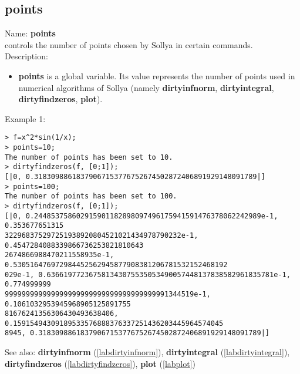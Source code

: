 \subsection{points}
\label{labpoints}
\noindent Name: \textbf{points}\\
controls the number of points chosen by Sollya in certain commands.\\

\noindent Description: \begin{itemize}

\item \textbf{points} is a global variable. Its value represents the number of points
   used in numerical algorithms of Sollya (namely \textbf{dirtyinfnorm},
   \textbf{dirtyintegral}, \textbf{dirtyfindzeros}, \textbf{plot}).
\end{itemize}
\noindent Example 1: 
\begin{center}\begin{minipage}{15cm}\begin{Verbatim}[frame=single]
> f=x^2*sin(1/x);
> points=10;
The number of points has been set to 10.
> dirtyfindzeros(f, [0;1]);
[|0, 0.31830988618379067153776752674502872406891929148091789|]
> points=100;
The number of points has been set to 100.
> dirtyfindzeros(f, [0;1]);
[|0, 0.244853758602915901182898097496175941591476378062242989e-1, 0.353677651315
322968375297251938920804521021434978790232e-1, 0.4547284088339866736253821810643
2674866988470211558935e-1, 0.530516476972984452562945877908381206781532152468192
029e-1, 0.636619772367581343075535053490057448137838582961835781e-1, 0.774999999
999999999999999999999999999999999999991344519e-1, 0.1061032953945968905125891755
81676241356306430493638406, 0.15915494309189533576888376337251436203445964574045
8945, 0.31830988618379067153776752674502872406891929148091789|]
\end{Verbatim}
\end{minipage}\end{center}
See also: \textbf{dirtyinfnorm} (\ref{labdirtyinfnorm}), \textbf{dirtyintegral} (\ref{labdirtyintegral}), \textbf{dirtyfindzeros} (\ref{labdirtyfindzeros}), \textbf{plot} (\ref{labplot})
